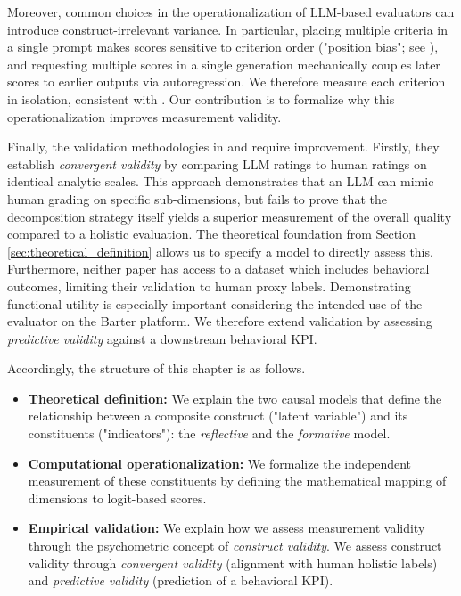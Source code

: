 
Moreover, common choices in the operationalization of LLM-based evaluators can introduce construct-irrelevant variance. In particular, placing multiple criteria in a single prompt makes scores sensitive to criterion order ("position bias"; see \citet{shi_judging_2025}), and requesting multiple scores in a single generation mechanically couples later scores to earlier outputs via autoregression. We therefore measure each criterion in isolation, consistent with \citet{bang_transforming_2025}. Our contribution is to formalize why this operationalization improves measurement validity.

Finally, the validation methodologies in \citet{li-fine-grained-2026} and \citet{wang2025evaluating} require improvement. Firstly, they establish \textit{convergent validity} by comparing LLM ratings to human ratings on identical analytic scales. This approach demonstrates that an LLM can mimic human grading on specific sub-dimensions, but fails to prove that the decomposition strategy itself yields a superior measurement of the overall quality compared to a holistic evaluation. The theoretical foundation from Section \ref{sec:theoretical_definition} allows us to specify a model to directly assess this. Furthermore, neither paper has access to a dataset which includes behavioral outcomes, limiting their validation to human proxy labels. Demonstrating functional utility is especially important considering the intended use of the evaluator on the Barter platform. We therefore extend validation by assessing \textit{predictive validity} against a downstream behavioral KPI. 

Accordingly, the structure of this chapter is as follows. 

\begin{itemize}
    \item \textbf{Theoretical definition:} We explain the two causal models that define the relationship between a composite construct ("latent variable") and its constituents ("indicators"): the \emph{reflective} and the \emph{formative} model. 
    \item \textbf{Computational operationalization:} We formalize the independent measurement of these constituents by defining the mathematical mapping of dimensions to logit-based scores. 
    \item \textbf{Empirical validation:} We explain how we assess measurement validity through the psychometric concept of \textit{construct validity}. We assess construct validity through \textit{convergent validity} (alignment with human holistic labels) and \textit{predictive validity} (prediction of a behavioral KPI). 
\end{itemize}

